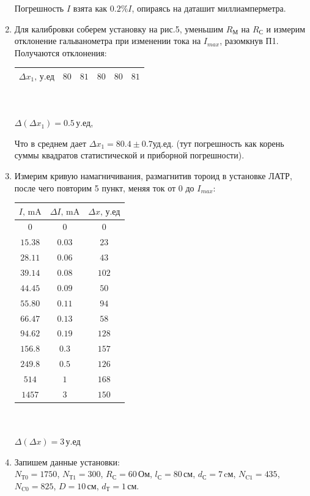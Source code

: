 \documentclass[a4paper]{article}
\begin{document}
\begin{enumerate}
Погрешность $I$ взята как $0.2\%I$, опираясь на даташит миллиамперметра.


\item
Для калибровки соберем установку на рис.5, уменьшим $R_\text{М}$ на $R_\text{С}$ и измерим отклонение гальванометра при изменении тока на $I_{max}$, разомкнув П1.
Получаются отклонения:
\begin{center}
\begin{tabular}{|c|c|c|c|c|c|}\hline
$\Delta x_1,\,\text{у.ед}$&$80$&$81$&$80$&$80$&$81$\\\hline
\end{tabular}\\~\\
$\Delta (\Delta x_1) = 0.5\,\text{у.ед}$,
\end{center}
Что в среднем дает $\Delta x_1=80.4\pm0.7\text{уд.ед.}$ (тут погрешность как корень суммы квадратов статистической и приборной погрешности).

\newpage
\item
Измерим кривую намагничивания, размагнитив тороид в установке ЛАТР, после чего повторим 5 пункт, меняя ток от $0$ до $I_{max}$:

\begin{center}
\begin{tabular}{|c|c|c|}\hline
$I\text{, mA}$&$\Delta I\text{, mA}$&$\Delta x\text{, у.ед}$\\\hline
$0$&$0$&$0$\\\hline
$15.38$&$0.03$&$23$\\\hline
$28.11$&$0.06$&$43$\\\hline
$39.14$&$0.08$&$102$\\\hline
$44.45$&$0.09$&$50$\\\hline
$55.80$&$0.11$&$94$\\\hline
$66.47$&$0.13$&$58$\\\hline
$94.62$&$0.19$&$128$\\\hline
$156.8$&$0.3$&$157$\\\hline
$249.8$&$0.5$&$126$\\\hline
$514$&$1$&$168$\\\hline
$1457$&$3$&$150$\\\hline
\end{tabular}\\~\\
$\Delta (\Delta x)=3\,\text{у.ед}$
\end{center}

\item
Запишем данные установки:\\
$N_\text{Т0}=1750$, $N_\text{Т1}=300$, $R_\text{С}=60\,\text{Ом}$, $l_\text{С}=80\,\text{см}$, $d_\text{С}=7\,\text{cм}$, $N_\text{C1}=435$, $N_\text{C0}=825$, $D=10\,\text{см}$, $d_\text{Т}=1\,\text{см}$.

\end{enumerate}
\end{document}
